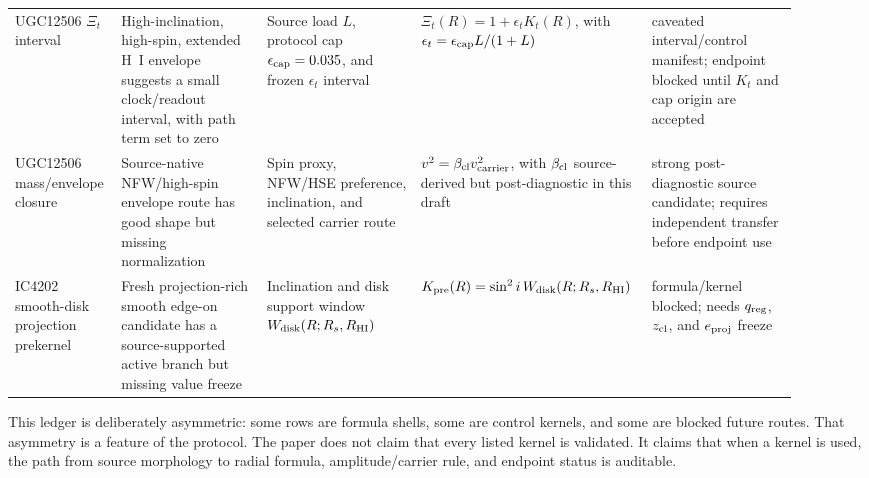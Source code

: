 \documentclass[11pt]{article}
\begin{document}
\begin{landscape}
\begin{longtable}{@{}p{0.13\linewidth}p{0.18\linewidth}p{0.19\linewidth}p{0.23\linewidth}p{0.18\linewidth}@{}}
UGC12506 \(\Xi_t\) interval &
High-inclination, high-spin, extended H~I envelope suggests a small
clock/readout interval, with path term set to zero &
Source load \(L\), protocol cap \(\epsilon_{\rm cap}=0.035\), and frozen
\(\epsilon_t\) interval &
\(\Xi_t(R)=1+\epsilon_tK_t(R)\), with
\(\epsilon_t=\epsilon_{\rm cap}L/(1+L)\) &
caveated interval/control manifest; endpoint blocked until \(K_t\) and cap
origin are accepted \\

UGC12506 mass/envelope closure &
Source-native NFW/high-spin envelope route has good shape but missing
normalization &
Spin proxy, NFW/HSE preference, inclination, and selected carrier route &
\(v^2=\beta_{\rm cl}v_{\rm carrier}^2\), with \(\beta_{\rm cl}\) source-derived
but post-diagnostic in this draft &
strong post-diagnostic source candidate; requires independent transfer before
endpoint use \\

IC4202 smooth-disk projection prekernel &
Fresh projection-rich smooth edge-on candidate has a source-supported active
branch but missing value freeze &
Inclination and disk support window \(W_{\rm disk}(R;R_s,R_{\rm HI})\) &
\(K_{\rm pre}(R)=\sin^2i\,W_{\rm disk}(R;R_s,R_{\rm HI})\) &
formula/kernel blocked; needs \(q_{\rm reg}\), \(z_{\rm cl}\), and
\(e_{\rm proj}\) freeze \\

\end{longtable}
\endgroup
\end{landscape}

This ledger is deliberately asymmetric: some rows are formula shells, some are
control kernels, and some are blocked future routes.  That asymmetry is a
feature of the protocol.  The paper does not claim that every listed kernel is
validated.  It claims that when a kernel is used, the path from source
morphology to radial formula, amplitude/carrier rule, and endpoint status is
auditable.
\end{document}
